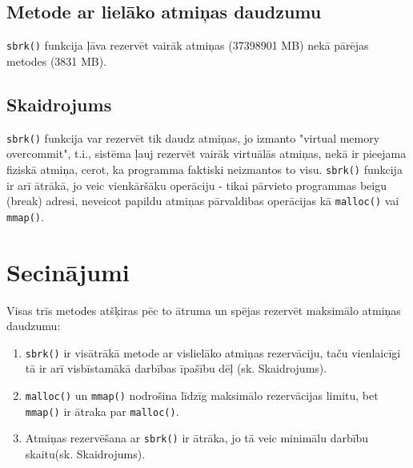 \documentclass{report}
\begin{document}
	\subsection{Metode ar lielāko atmiņas daudzumu}
	
	\texttt{sbrk()} funkcija ļāva rezervēt vairāk atmiņas (37398901 MB) nekā pārējas metodes (3831 MB).
	
	\subsection{Skaidrojums}
	
	\texttt{sbrk()} funkcija var rezervēt tik daudz atmiņas, jo izmanto "virtual memory overcommit", t.i., sistēma ļauj rezervēt vairāk virtuālās atmiņas, nekā ir pieejama fiziskā atmiņa, cerot, ka programma faktiski neizmantos to visu. \texttt{sbrk()} funkcija ir arī ātrākā, jo veic vienkāršāku operāciju - tikai pārvieto programmas beigu (break) adresi, neveicot papildu atmiņas pārvaldibas operācijas kā \texttt{malloc()} vai \texttt{mmap()}.
	
	\section{Secinājumi}
	
	Visas trīs metodes atšķiras pēc to ātruma un spējas rezervēt maksimālo atmiņas daudzumu:
	
	\begin{enumerate}
	\item \texttt{sbrk()} ir visātrākā metode ar vislielāko atmiņas rezervāciju, taču vienlaicīgi tā ir arī visbīstamākā darbības īpašību dēļ (sk. Skaidrojums).
	
	\item \texttt{malloc()} un \texttt{mmap()} nodrošina līdzīg maksimālo rezervācijas limitu, bet \texttt{mmap()} ir ātraka par \texttt{malloc()}.
	
	\item Atmiņas rezervēšana ar \texttt{sbrk()} ir ātrāka, jo tā veic minimālu darbību skaitu(sk. Skaidrojums).
	\end{enumerate}
\end{document}
